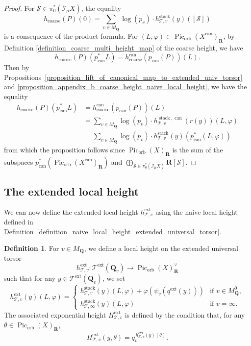 \documentclass{proc-l}
\newcommand{\R}{\mathbf{R}}
\newcommand{\Q}{\mathbf{Q}}
\DeclareMathOperator{\Pic}{Pic}
\DeclareMathOperator{\can}{can}
\DeclareMathOperator{\stack}{stack}
\DeclareMathOperator{\coarse}{coarse}
\DeclareMathOperator{\orb}{orb}
\DeclareMathOperator{\ext}{ext}
\newcommand{\stackS}{\mathcal{S}}
\newcommand{\stackT}{\mathcal{T}}
\newcommand{\sheafI}{\mathcal{I}}
\newcommand{\twistsector}{\pi_0^*(\sheafI_{\mu} X)}
\theoremstyle{definition}
\newtheorem{definition}[theorem]{Definition}
\theoremstyle{remark}
\numberwithin{equation}{section}
\begin{document}
\begin{proof}
For $\stackS \in \twistsector$, the equality $$h_{\coarse}(P)(0) = \sum\limits_{v \in M_{\Q}} \log(p_v) \cdot h_{\stackT,v}^{\stack}(y)([\stackS]) $$is a consequence of the product formula. For $(L,\varphi) \in \Pic_{\orb}(X^{\can})_{\R}$, by Definition \ref{definition_coarse_multi_height_map} of the coarse height, we have $$h_{\coarse}(P)(p_{\can}^*L) = h_{\coarse}^{\can}(p_{\can}(P))(L) .$$Then by Propositions~\ref{proposition_lift_of_canonical_map_to_extended_univ_torsor} and \ref{proposition_appendix_b_coarse_height_naive_local_height}, we have the equality
\begin{align*}
h_{\coarse}(P)(p_{\can}^*L) &= h_{\coarse}^{\can}(p_{\can}(P))(L) \\
&= \sum\limits_{v \in M_{\Q}} \log(p_v) \cdot h_{\stackT,v}^{\stack,\can}(r(y))(L,\varphi) \\
&= \sum\limits_{v \in M_{\Q}} \log(p_v) \cdot  h_{\stackT,v}^{\stack}(y)(p_{\can}^*(L,\varphi)) 
\end{align*}from which the proposition follows since $\Pic_{\orb}(X)_{\R}$ is the sum of the subspaces $p_{\can}^*\left(\Pic_{\orb}(X^{\can})_{\R}\right) $ and $\bigoplus\limits_{\stackS \in \twistsector} \R [\stackS] $.


\end{proof}

\subsection{The extended local height}




We can now define the extended local height $h_{\stackT,v}^{\ext}$ using the naive local height defined in Definition~\ref{definition_naive_local_height_extended_universal_torsor}.

\begin{definition}\label{definition_local_height_extended_universal_torsor}
For $v \in M_{\Q}$, we define a local height on the extended universal torsor
\[
h_{\stackT,v}^{\ext} : \stackT^{\ext}(\Q_v) \longrightarrow \Pic_{\orb}(X)^{\vee}_{\R}
\]such that for any $y \in \stackT^{\ext}(\Q_v)$, we set
\[
h_{\stackT,v}^{\ext}(y)(L,\varphi)
=
\begin{cases}
h_{\stackT,v}^{\stack}(y)(L,\varphi)
+
\varphi\!\left(\psi_v\!\left(q^{\ext}(y)\right)\right)
& \text{if } v \in M_{\Q}^0, \\[0.3em]
h_{\stackT,\infty}^{\stack}(y)(L,\varphi)
& \text{if } v = \infty.
\end{cases}
\]The associated exponential height $H^{\ext}_{\stackT,v}$ is defined by the condition that, for any $\theta \in \Pic_{\orb}(X)_{\R}$,
\[
H^{\ext}_{\stackT,v}(y,\theta)
=
q_v^{\,h^{\ext}_{\stackT,v}(y)(\theta)}.
\]
\end{definition}
\end{document}

